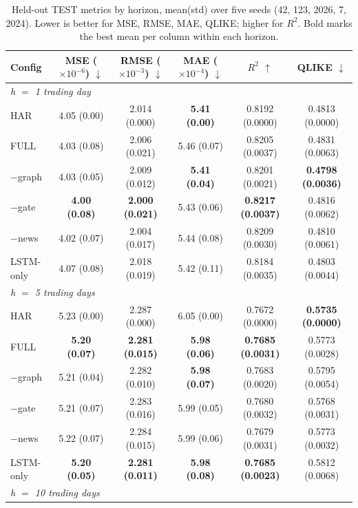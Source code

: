 \documentclass[runningheads]{llncs}
\begin{document}
\begin{table}[t]
\caption{Held-out TEST metrics by horizon, mean(std) over five seeds (42, 123, 2026, 7, 2024). Lower is
better for MSE, RMSE, MAE, QLIKE; higher for $R^2$. Bold marks the best mean per column within each
horizon.}
\label{tab:metrics}
\centering
\begin{tabular}{lccccc}
\toprule
Config & MSE ($\times10^{-6}$) $\downarrow$ & RMSE ($\times10^{-3}$) $\downarrow$
 & MAE ($\times10^{-4}$) $\downarrow$ & $R^2$ $\uparrow$ & QLIKE $\downarrow$ \\
\midrule
\multicolumn{6}{l}{\emph{h $=$ 1 trading day}} \\
HAR         & 4.05 (0.00) & 2.014 (0.000) & \textbf{5.41 (0.00)} & 0.8192 (0.0000) & 0.4813 (0.0000) \\
FULL        & 4.03 (0.08) & 2.006 (0.021) & 5.46 (0.07) & 0.8205 (0.0037) & 0.4831 (0.0063) \\
$-$graph    & 4.03 (0.05) & 2.009 (0.012) & \textbf{5.41 (0.04)} & 0.8201 (0.0021) & \textbf{0.4798 (0.0036)} \\
$-$gate     & \textbf{4.00 (0.08)} & \textbf{2.000 (0.021)} & 5.43 (0.06) & \textbf{0.8217 (0.0037)} & 0.4816 (0.0062) \\
$-$news     & 4.02 (0.07) & 2.004 (0.017) & 5.44 (0.08) & 0.8209 (0.0030) & 0.4810 (0.0061) \\
LSTM-only   & 4.07 (0.08) & 2.018 (0.019) & 5.42 (0.11) & 0.8184 (0.0035) & 0.4803 (0.0044) \\
\midrule
\multicolumn{6}{l}{\emph{h $=$ 5 trading days}} \\
HAR         & 5.23 (0.00) & 2.287 (0.000) & 6.05 (0.00) & 0.7672 (0.0000) & \textbf{0.5735 (0.0000)} \\
FULL        & \textbf{5.20 (0.07)} & \textbf{2.281 (0.015)} & \textbf{5.98 (0.06)} & \textbf{0.7685 (0.0031)} & 0.5773 (0.0028) \\
$-$graph    & 5.21 (0.04) & 2.282 (0.010) & \textbf{5.98 (0.07)} & 0.7683 (0.0020) & 0.5795 (0.0054) \\
$-$gate     & 5.21 (0.07) & 2.283 (0.016) & 5.99 (0.05) & 0.7680 (0.0032) & 0.5768 (0.0031) \\
$-$news     & 5.22 (0.07) & 2.284 (0.015) & 5.99 (0.06) & 0.7679 (0.0031) & 0.5773 (0.0032) \\
LSTM-only   & \textbf{5.20 (0.05)} & \textbf{2.281 (0.011)} & \textbf{5.98 (0.08)} & \textbf{0.7685 (0.0023)} & 0.5812 (0.0068) \\
\midrule
\multicolumn{6}{l}{\emph{h $=$ 10 trading days}} \\

\end{tabular}
\end{table}
\end{document}
